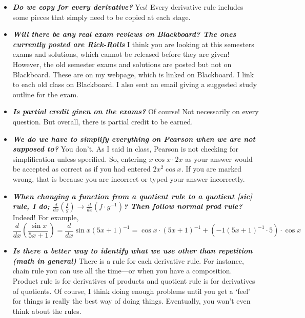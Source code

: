 \documentclass[11pt,letterpaper]{article}
\begin{document}
\begin{itemize}
\item {\bfseries\itshape Do we copy for every derivative?} Yes! Every derivative rule includes some pieces that simply need to be copied at each stage. 

\item {\bfseries\itshape Will there be any real exam reviews on Blackboard? The ones currently posted are Rick-Rolls} I think you are looking at this semesters exams and solutions, which cannot be released before they are given! However, the old semester exams and solutions are posted but not on Blackboard. These are on my webpage, which is linked on Blackboard. I link to each old class on Blackboard. I also sent an email giving a suggested study outline for the exam. 

\item {\bfseries\itshape Is partial credit given on the exams?} Of course! Not necessarily on every question. But overall, there is partial credit to be earned. 

\item {\bfseries\itshape We do we have to simplify everything on Pearson when we are not supposed to?} You don't. As I said in class, Pearson is not checking for simplification unless specified. So, entering $x \cos x \cdot 2x$ as your answer would be accepted as correct as if you had entered $2x^2 \cos x$. If you are marked wrong, that is because you are incorrect or typed your answer incorrectly. 

\item {\bfseries\itshape When changing a function from a quotient rule to a quotient [sic] rule, I do; $\frac{d}{dx} \left( \frac{f}{g} \right) \to \frac{d}{dx} \left(f \cdot g^{-1} \right)$? Then follow normal prod rule?} Indeed! For example,
	\[
	\dfrac{d}{dx} \left( \dfrac{\sin x}{5x + 1} \right)= \dfrac{d}{dx} \sin x (5x + 1)^{-1}= \cos x \cdot (5x + 1)^{-1} + \left( -1(5x + 1)^{-1} \cdot 5 \right) \cdot \cos x
	\]

\item {\bfseries\itshape Is there a better way to identify what we use other than repetition (math in general)} There is a rule for each derivative rule. For instance, chain rule you can use all the time---or when you have a composition. Product rule is for derivatives of products and quotient rule is for derivatives of quotients. Of course, I think doing enough problems until you get a `feel' for things is really the best way of doing things. Eventually, you won't even think about the rules. 


\end{itemize}
\end{document}
